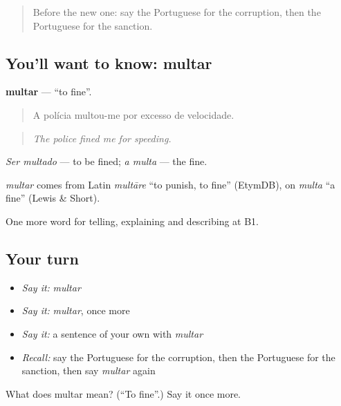 \label{lesson:PT-C389-multar}



\begin{quote}
Before the new one: say the Portuguese for the corruption, then the Portuguese for the sanction.
\end{quote}

\subsection*{You'll want to know: multar}
\textbf{multar} — \textquotedblleft{}to fine\textquotedblright{}.

\begin{quote}
A polícia multou-me por excesso de velocidade.
\end{quote}

\begin{quote}
\emph{The police fined me for speeding.}
\end{quote}

\emph{Ser multado} — to be fined; \emph{a multa} — the fine.

\begin{cousinweb}
\emph{multar} comes from Latin \emph{multāre} \textquotedblleft{}to punish, to fine\textquotedblright{} (EtymDB), on \emph{multa} \textquotedblleft{}a fine\textquotedblright{} (Lewis \& Short).
\end{cousinweb}

\begin{grammarlens}[title={What you've built}]
One more word for telling, explaining and describing at B1.
\end{grammarlens}

\subsection*{Your turn}
\begin{itemize}
\raggedright
  \item \emph{Say it:} \emph{multar}
  \item \emph{Say it:} \emph{multar}, once more
  \item \emph{Say it:} a sentence of your own with \emph{multar}
  \item \emph{Recall:} say the Portuguese for the corruption, then the Portuguese for the sanction, then say \emph{multar} again
\end{itemize}

\begin{tcolorbox}[breakable,colback=teal!4,colframe=teal!35!black,title={Before you move on}]
What does multar mean? (\textquotedblleft{}To fine\textquotedblright{}.) Say it once more.
\end{tcolorbox}
